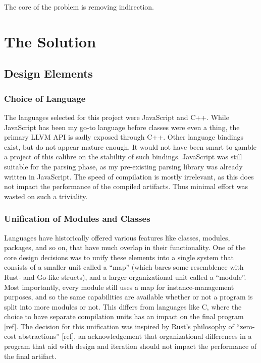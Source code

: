 \documentclass[12pt,a4paper,twoside]{report}
\begin{document}
The core of the problem is removing indirection.

\chapter{The Solution}

\section{Design Elements}

\subsection{Choice of Language}

The languages selected for this project were JavaScript and C++. While JavaScript has been my go-to language before classes were even a thing, the primary LLVM API is sadly exposed through C++. Other language bindings exist, but do not appear mature enough. It would not have been smart to gamble a project of this calibre on the stability of such bindings. JavaScript was still suitable for the parsing phase, as my pre-existing parsing library was already written in JavaScript. The speed of compilation is mostly irrelevant, as this does not impact the performance of the compiled artifacts. Thus minimal effort was wasted on such a triviality.

\subsection{Unification of Modules and Classes}

Languages have historically offered various features like classes, modules, packages, and so on, that have much overlap in their functionality. One of the core design decisions was to unify these elements into a single system that consists of a smaller unit called a ``map'' (which bares some resemblence with Rust- and Go-like structs), and a larger organizational unit called a ``module''. Most importantly, every module still uses a map for instance-management purposes, and so the same capabilities are available whether or not a program is split into more modules or not. This differs from languages like C, where the choice to have separate compilation units has an impact on the final program [ref]. The decision for this unification was inspired by Rust's philosophy of ``zero-cost abstractions'' [ref], an acknowledgement that organizational differences in a program that aid with design and iteration should not impact the performance of the final artifact.
\end{document}
